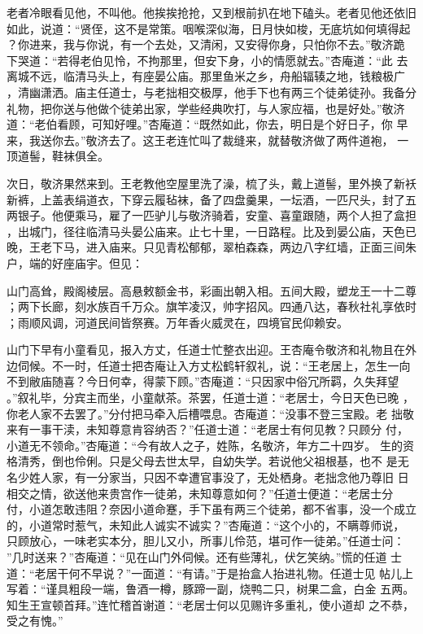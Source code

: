 老者冷眼看见他，不叫他。他挨挨抢抢，又到根前扒在地下磕头。老者见他还依旧
如此，说道：“贤侄，这不是常策。咽喉深似海，日月快如梭，无底坑如何填得起
？你进来，我与你说，有一个去处，又清闲，又安得你身，只怕你不去。”敬济跪
下哭道：“若得老伯见怜，不拘那里，但安下身，小的情愿就去。”杏庵道：“此
去离城不远，临清马头上，有座晏公庙。那里鱼米之乡，舟船辐辏之地，钱粮极广
，清幽潇洒。庙主任道士，与老拙相交极厚，他手下也有两三个徒弟徒孙。我备分
礼物，把你送与他做个徒弟出家，学些经典吹打，与人家应福，也是好处。”敬济
道：“老伯看顾，可知好哩。”杏庵道：“既然如此，你去，明日是个好日子，你
早来，我送你去。”敬济去了。这王老连忙叫了裁缝来，就替敬济做了两件道袍，
一顶道髻，鞋袜俱全。

次日，敬济果然来到。王老教他空屋里洗了澡，梳了头，戴上道髻，里外换了新袄
新裤，上盖表绢道衣，下穿云履毡袜，备了四盘羹果，一坛酒，一匹尺头，封了五
两银子。他便乘马，雇了一匹驴儿与敬济骑着，安童、喜童跟随，两个人担了盒担
，出城门，径往临清马头晏公庙来。止七十里，一日路程。比及到晏公庙，天色已
晚，王老下马，进入庙来。只见青松郁郁，翠柏森森，两边八字红墙，正面三间朱
户，端的好座庙宇。但见：

山门高耸，殿阁棱层。高悬敕额金书，彩画出朝入相。五间大殿，塑龙王一十二尊
；两下长廊，刻水族百千万众。旗竿凌汉，帅字招风。四通八达，春秋社礼享依时
；雨顺风调，河道民间皆祭赛。万年香火威灵在，四境官民仰赖安。

山门下早有小童看见，报入方丈，任道士忙整衣出迎。王杏庵令敬济和礼物且在外
边伺候。不一时，任道士把杏庵让入方丈松鹤轩叙礼，说：“王老居上，怎生一向
不到敝庙随喜？今日何幸，得蒙下顾。”杏庵道：“只因家中俗冗所羁，久失拜望
。”叙礼毕，分宾主而坐，小童献茶。茶罢，任道士道：“老居士，今日天色已晚
，你老人家不去罢了。”分付把马牵入后槽喂息。杏庵道：“没事不登三宝殿。老
拙敬来有一事干渎，未知尊意肯容纳否？”任道士道：“老居士有何见教？只顾分
付，小道无不领命。”杏庵道：“今有故人之子，姓陈，名敬济，年方二十四岁。
生的资格清秀，倒也伶俐。只是父母去世太早，自幼失学。若说他父祖根基，也不
是无名少姓人家，有一分家当，只因不幸遭官事没了，无处栖身。老拙念他乃尊旧
日相交之情，欲送他来贵宫作一徒弟，未知尊意如何？”任道士便道：“老居士分
付，小道怎敢违阻？奈因小道命蹇，手下虽有两三个徒弟，都不省事，没一个成立
的，小道常时惹气，未知此人诚实不诚实？”杏庵道：“这个小的，不瞒尊师说，
只顾放心，一味老实本分，胆儿又小，所事儿伶范，堪可作一徒弟。”任道士问：
”几时送来？”杏庵道：“见在山门外伺候。还有些薄礼，伏乞笑纳。”慌的任道
士道：“老居干何不早说？”一面道：“有请。”于是抬盒人抬进礼物。任道士见
帖儿上写着：“谨具粗段一端，鲁酒一樽，豚蹄一副，烧鸭二只，树果二盒，白金
五两。知生王宣顿首拜。”连忙稽首谢道：“老居士何以见赐许多重礼，使小道却
之不恭，受之有愧。”

